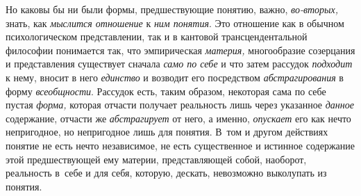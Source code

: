 Но каковы бы ни были формы, предшествующие понятию, важно,
{\em во-вторых,} знать, как {\em мыслится отношение} к {\em ним понятия}.
Это отношение как в обычном психологическом представлении,
так и в кантовой трансцендентальной философии понимается так, что
эмпирическая {\em материя,}
многообразие созерцания и представления существует сначала
{\em само по себе} и что затем рассудок {\em подходит} к нему, вносит в него
{\em единство} и возводит его посредством {\em абстрагирования} в форму
{\em всеобщности}. Рассудок есть, таким образом, некоторая сама
по себе пустая {\em форма,}
которая отчасти получает реальность лишь через указанное
{\em данное} содержание, отчасти же {\em абстрагирует}
от него, а именно, {\em опускает} его как
нечто непригодное, но непригодное лишь для понятия. В~том и другом
действиях понятие не есть нечто независимое, не есть существенное и
истинное содержание этой предшествующей ему материи, представляющей собой,
наоборот, реальность в~себе и для себя, которую, дескать, невозможно
выколупать из понятия.

